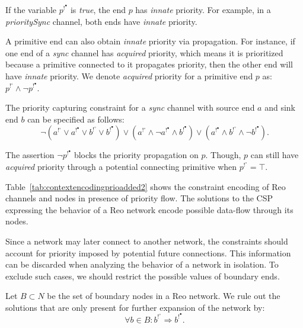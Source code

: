 %
If the variable $p^{!^\bullet}$ is \emph{true}, the end $p$ has \emph{innate} priority. For example, in a \emph{prioritySync} channel, both ends have \emph{innate} priority. %
  
A primitive end can also obtain \emph{innate} priority via propagation. For instance, if one end of a \emph{sync} channel has \emph{acquired} priority, which means it is prioritized because a primitive connected to it propagates priority, then the other end will have \emph{innate} priority. We denote \emph{acquired} priority for a primitive end $p$ as: $p^{!^\circ} \wedge \neg p^{!^\bullet}$. 

The priority capturing constraint for a \emph{sync} channel with source end $a$ and sink end $b$ can be specified as follows:
$$\neg(a^{!^\circ} \vee a^{!^\bullet} \vee b^{!^\circ} \vee b^{!^\bullet}) \vee (a^{!^\circ} \wedge \neg a^{!^\bullet} \wedge b^{!^\bullet}) \vee (a^{!^\bullet} \wedge b^{!^\circ} \wedge \neg b^{!^\bullet}).$$
 
The assertion $\neg p^{!^\bullet}$ blocks the priority propagation on $p$. Though, $p$ can still have \emph{acquired} priority through a potential connecting primitive when $p^{!^\circ} = \top$.
 
Table~\ref{tab:contextencodingprioadded2} shows the constraint encoding of Reo channels and nodes in presence of priority flow. The solutions to the CSP expressing the behavior of a Reo network encode possible data-flow through its nodes. 

Since a network may later connect to another network, the constraints should account for priority imposed by potential future connections. This information can be discarded when analyzing the behavior of a network in isolation. To exclude such cases, we should restrict the possible values of boundary ends. %

\begin{BehAxiom}
\label{ax:grnd}
Let $B \subset N$ be the set of boundary nodes in a Reo network. We  rule out the solutions that are only present for further expansion of the network by:
$$\forall b \in B: b^{!^\circ}\Rightarrow b^{!^\bullet}.$$
\end{BehAxiom}

